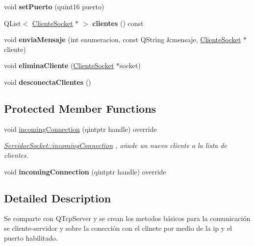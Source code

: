 \begin{DoxyCompactItemize}
void {\bfseries set\+Puerto} (quint16 puerto)
\item 
\mbox{\label{class_servidor_socket_ad1d5aa1a0f189c69eae5f72bdbd709ed}} 
Q\+List$<$ \hyperlink{class_cliente_socket}{Cliente\+Socket} $\ast$ $>$ {\bfseries clientes} () const
\item 
\mbox{\label{class_servidor_socket_ae6a3796c4a79a64e667268080716d056}} 
void {\bfseries envia\+Mensaje} (int enumeracion, const Q\+String \&mensaje, \hyperlink{class_cliente_socket}{Cliente\+Socket} $\ast$cliente)
\item 
\mbox{\label{class_servidor_socket_a6e7e13a58e360f8811c2802e2a9c6883}} 
void {\bfseries elimina\+Cliente} (\hyperlink{class_cliente_socket}{Cliente\+Socket} $\ast$socket)
\item 
\mbox{\label{class_servidor_socket_aa80657a78d484a51a9c470232960412b}} 
void {\bfseries desconecta\+Clientes} ()
\end{DoxyCompactItemize}
\subsection*{Protected Member Functions}
\begin{DoxyCompactItemize}
\item 
void \hyperlink{class_servidor_socket_ad72a3bb3c5ea8a940060d964fba86a9c}{incoming\+Connection} (qintptr handle) override
\begin{DoxyCompactList}\small\item\em \hyperlink{class_servidor_socket_ad72a3bb3c5ea8a940060d964fba86a9c}{Servidor\+Socket\+::incoming\+Connection} , añade un nuevo cliente a la lista de clientes. \end{DoxyCompactList}\item 
\mbox{\label{class_servidor_socket_ad72a3bb3c5ea8a940060d964fba86a9c}} 
void {\bfseries incoming\+Connection} (qintptr handle) override
\end{DoxyCompactItemize}


\subsection{Detailed Description}
Se comparte con Q\+Tcp\+Server y se crean los metodos básicos para la comunicación se cliente-\/servidor y sobre la conección con el clinete por medio de la ip y el puerto habilitado. 



